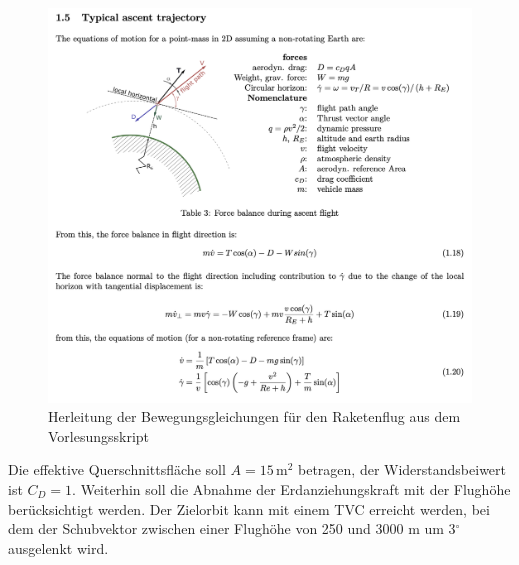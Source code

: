 \documentclass[12pt]{article}
\begin{document}
\begin{figure}
    \centering
    \label{fig:equations}
    \includegraphics[width=1\textwidth]{images/equations.png}
    \caption{Herleitung der Bewegungsgleichungen für den Raketenflug aus dem Vorlesungsskript}
\end{figure}

Die effektive Querschnittsfläche soll $A = 15 \, \text{m}^2$ betragen, der Widerstandsbeiwert ist $C_D = 1$. Weiterhin soll die Abnahme der Erdanziehungskraft mit der Flughöhe berücksichtigt werden. Der Zielorbit kann mit einem TVC erreicht werden, bei dem der Schubvektor zwischen einer Flughöhe von 250 und 3000 m um 3$^\circ$ ausgelenkt wird.
\end{document}
